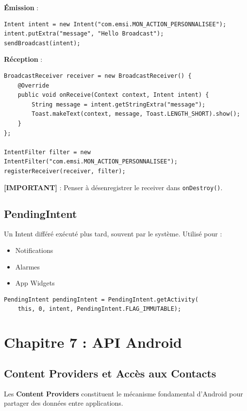 \documentclass[11pt,a4paper]{article}
\begin{document}
\textbf{Émission} :
\begin{lstlisting}
Intent intent = new Intent("com.emsi.MON_ACTION_PERSONNALISEE");
intent.putExtra("message", "Hello Broadcast");
sendBroadcast(intent);
\end{lstlisting}

\textbf{Réception} :
\begin{lstlisting}
BroadcastReceiver receiver = new BroadcastReceiver() {
    @Override
    public void onReceive(Context context, Intent intent) {
        String message = intent.getStringExtra("message");
        Toast.makeText(context, message, Toast.LENGTH_SHORT).show();
    }
};

IntentFilter filter = new IntentFilter("com.emsi.MON_ACTION_PERSONNALISEE");
registerReceiver(receiver, filter);
\end{lstlisting}

\textbf{[IMPORTANT]} : Penser à désenregistrer le receiver dans \texttt{onDestroy()}.

\subsection{PendingIntent}

Un Intent différé exécuté plus tard, souvent par le système. Utilisé pour :
\begin{itemize}
    \item Notifications
    \item Alarmes
    \item App Widgets
\end{itemize}

\begin{lstlisting}
PendingIntent pendingIntent = PendingIntent.getActivity(
    this, 0, intent, PendingIntent.FLAG_IMMUTABLE);
\end{lstlisting}


\section{Chapitre 7 : API Android}

\subsection{Content Providers et Accès aux Contacts}

Les \textbf{Content Providers} constituent le mécanisme fondamental d'Android pour partager des données entre applications.
\end{document}
